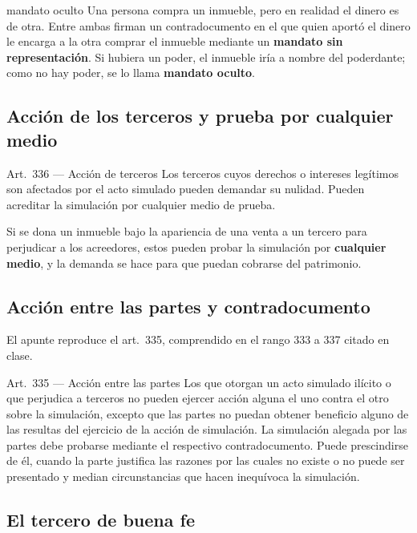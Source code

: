 \documentclass[12pt,oneside]{book}
\begin{document}
\begin{example}{mandato oculto}
Una persona compra un inmueble, pero en realidad el dinero es de otra. Entre ambas firman un contradocumento en el que quien aport\'o el dinero le encarga a la otra comprar el inmueble mediante un \textbf{mandato sin representaci\'on}. Si hubiera un poder, el inmueble ir\'ia a nombre del poderdante; como no hay poder, se lo llama \textbf{mandato oculto}.
\end{example}

\subsection{Acci\'on de los terceros y prueba por cualquier medio}

\begin{norma}{Art.~336 --- Acci\'on de terceros}
Los terceros cuyos derechos o intereses leg\'itimos son afectados por el acto simulado pueden demandar su nulidad. Pueden acreditar la simulaci\'on por cualquier medio de prueba.
\end{norma}

Si se dona un inmueble bajo la apariencia de una venta a un tercero para perjudicar a los acreedores, estos pueden probar la simulaci\'on por \textbf{cualquier medio}, y la demanda se hace para que puedan cobrarse del patrimonio.

\subsection{Acci\'on entre las partes y contradocumento}

El apunte reproduce el art.~335, comprendido en el rango 333 a 337 citado en clase.

\begin{norma}{Art.~335 --- Acci\'on entre las partes}
Los que otorgan un acto simulado il\'icito o que perjudica a terceros no pueden ejercer acci\'on alguna el uno contra el otro sobre la simulaci\'on, excepto que las partes no puedan obtener beneficio alguno de las resultas del ejercicio de la acci\'on de simulaci\'on. La simulaci\'on alegada por las partes debe probarse mediante el respectivo contradocumento. Puede prescindirse de \'el, cuando la parte justifica las razones por las cuales no existe o no puede ser presentado y median circunstancias que hacen inequ\'ivoca la simulaci\'on.
\end{norma}

\subsection{El tercero de buena fe}
\end{document}
